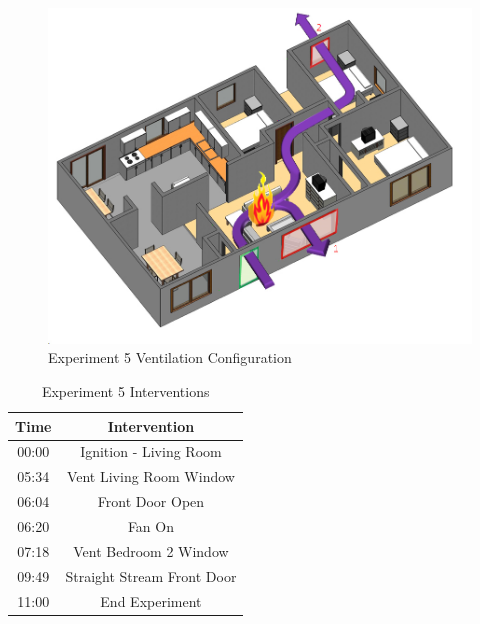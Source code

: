 \documentclass{article}
\begin{document}
\begin{figure}[h!]
	\centering
	\includegraphics[width=5in]{0_Images/FireExperiments/Single_Story/Experiment_5.jpg}
	\caption{Experiment 5 Ventilation Configuration}
	\label{fig:Exp5VentConfig}
\end{figure}


\begin{table}[H]
	\centering
	\caption{Experiment 5 Interventions}
	\begin{tabular}{|c|c|} 
		\hline
		Time & Intervention \\ \hline \hline
		00:00 & Ignition - Living Room \\ \hline
		05:34 & Vent Living Room Window \\ \hline
		06:04 & Front Door Open \\ \hline
		06:20 & Fan On \\ \hline
		07:18 & Vent Bedroom 2 Window \\ \hline
		09:49 & Straight Stream Front Door \\ \hline
		11:00 & End Experiment \\ \hline
	\end{tabular}
	\label{Table:Exp5Interventions}
\end{table}
\end{document}
